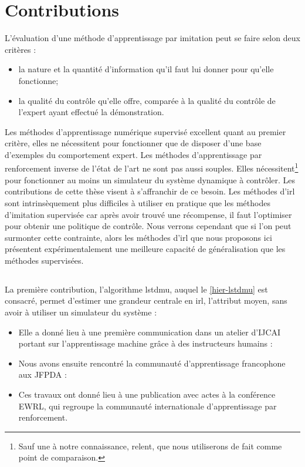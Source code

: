 \documentclass[frenchb,a4paper,justified,notoc]{tufte-book}
\begin{document}
\chapter{Contributions}
\label{sec-10}
\label{hier-contributions}


L'évaluation d'une méthode d'apprentissage par imitation peut se faire selon deux critères :
\begin{itemize}
\item la nature et la quantité d'information qu'il faut lui donner pour qu'elle fonctionne;
\item la qualité du contrôle qu'elle offre, comparée à la qualité du contrôle de l'expert ayant effectué la démonstration.
\end{itemize}


Les méthodes d'apprentissage numérique supervisé excellent quant au premier critère, elles ne nécessitent pour fonctionner que de disposer d'une base d'exemples du comportement expert. Les méthodes d'apprentissage par renforcement inverse de l'état de l'art ne sont pas aussi souples. Elles nécessitent\footnote{Sauf une à notre connaissance, \gls{relent}, que nous utiliserons de fait comme point de comparaison.
 } pour fonctionner au moins un simulateur du système dynamique à contrôler. Les contributions de cette thèse visent à s'affranchir de ce besoin. Les méthodes d'\gls{irl} sont intrinsèquement plus difficiles à utiliser en pratique que les méthodes d'imitation supervisée car après avoir trouvé une récompense, il faut l'optimiser pour obtenir une politique de contrôle. Nous verrons cependant que si l'on peut surmonter cette contrainte, alors les méthodes d'\gls{irl} que nous proposons ici présentent expérimentalement une meilleure capacité de généralisation que les méthodes supervisées.
\section{}
\label{sec-10-1}


La première contribution, l'algorithme \gls{lstdmu}, auquel le \autoref{hier-lstdmu} est consacré, permet d'estimer une grandeur centrale en \gls{irl}, l'attribut moyen, sans avoir à utiliser un simulateur du système :

\begin{itemize}
\item Elle a donné lieu à une première communication dans un atelier d'IJCAI portant sur l'apprentissage machine grâce à des instructeurs humains :
\end{itemize}
\begin{itemize}
\item Nous avons ensuite rencontré la communauté d'apprentissage francophone aux JFPDA :
\end{itemize}
\begin{itemize}
\item Ces travaux ont donné lieu à une publication avec actes à la conférence EWRL, qui regroupe la communauté internationale d'apprentissage par renforcement.
\end{itemize}
\end{document}
